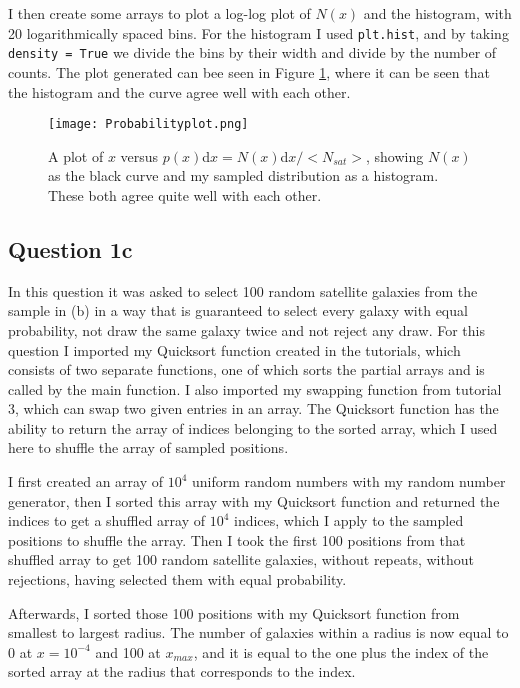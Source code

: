 I then create some arrays to plot a log-log plot of $N(x)$ and the histogram, with 20 logarithmically spaced bins.
For the histogram I used \texttt{plt.hist}, and by taking \texttt{density = True} we divide the bins by their width and divide by the number of counts.
The plot generated can bee seen in Figure \ref{fig:px}, where it can be seen that the histogram and the curve agree well with each other.

\begin{figure}[h!]
  \centering
  \texttt{[image: Probabilityplot.png]}
  \caption{A plot of $x$ versus $p(x)$d$x = N(x)$d$x/<N_{sat}>$, showing $N(x)$ as the black curve and my sampled distribution as a histogram. These both agree quite well with each other.}
  \label{fig:px}
\end{figure}


\subsection{Question 1c}

In this question it was asked to select 100 random satellite galaxies from the sample in (b) in a way that is guaranteed to select every galaxy with equal probability, not draw the same galaxy twice and not reject any draw.
For this question I imported my Quicksort function created in the tutorials, which consists of two separate functions, one of which sorts the partial arrays and is called by the main function.
I also imported my swapping function from tutorial 3, which can swap two given entries in an array.
The Quicksort function has the ability to return the array of indices belonging to the sorted array, which I used here to shuffle the array of sampled positions.

I first created an array of $10^4$ uniform random numbers with my random number generator, then I sorted this array with my Quicksort function and returned the indices to get a shuffled array of $10^4$ indices, which I apply to the sampled positions to shuffle the array.
Then I took the first 100 positions from that shuffled array to get 100 random satellite galaxies, without repeats, without rejections, having selected them with equal probability.

Afterwards, I sorted those 100 positions with my Quicksort function from smallest to largest radius.
The number of galaxies within a radius is now equal to 0 at $x = 10^{-4}$ and 100 at $x_{max}$, and it is equal to the one plus the index of the sorted array at the radius that corresponds to the index.

